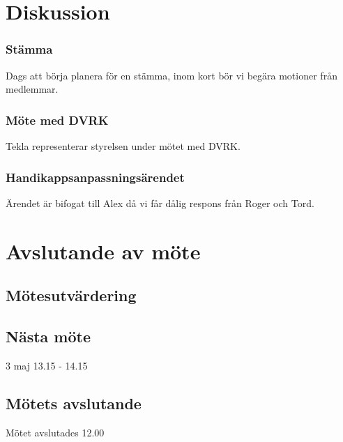 \documentclass[protokoll]{dvd}
\begin{document}

\newpage

\section{Diskussion}

\subsubsection{Stämma}
Dags att börja planera för en stämma, inom kort bör vi begära motioner från medlemmar.

\subsubsection{Möte med DVRK}
Tekla representerar styrelsen under mötet med DVRK.

\subsubsection{Handikappsanpassningsärendet}
Ärendet är bifogat till Alex då vi får dålig respons från Roger och Tord.

\newpage

\section{Avslutande av möte}


\subsection{Mötesutvärdering}

\subsection{Nästa möte}
3 maj 13.15 - 14.15

\subsection{Mötets avslutande}

Mötet avslutades 12.00

\styrelsesignaturer
\end{document}
